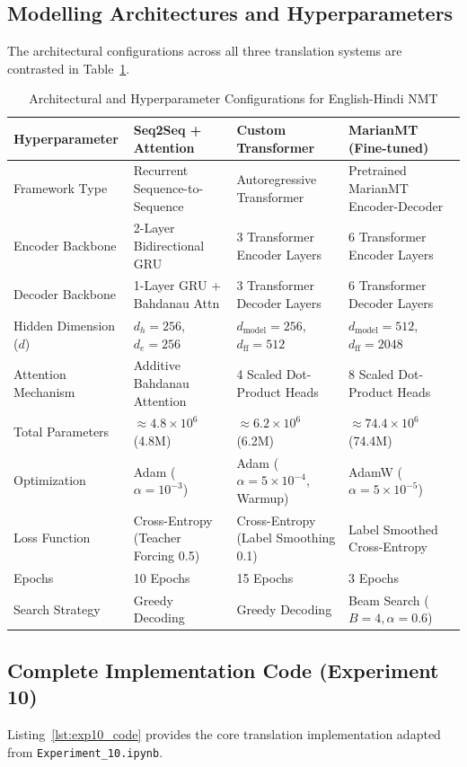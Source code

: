 \documentclass[12pt,a4paper]{report}
\begin{document}
\subsection{Modelling Architectures and Hyperparameters}
The architectural configurations across all three translation systems are contrasted in Table~\ref{tab:exp10_architectures}.

\begin{table}[H]
\centering
\caption{Architectural and Hyperparameter Configurations for English-Hindi NMT}
\label{tab:exp10_architectures}
\begin{tabularx}{\textwidth}{lXXX}
\toprule
\textbf{Hyperparameter} & \textbf{Seq2Seq + Attention} & \textbf{Custom Transformer} & \textbf{MarianMT (Fine-tuned)} \\
\midrule
Framework Type & Recurrent Sequence-to-Sequence & Autoregressive Transformer & Pretrained MarianMT Encoder-Decoder \\
Encoder Backbone & 2-Layer Bidirectional GRU & 3 Transformer Encoder Layers & 6 Transformer Encoder Layers \\
Decoder Backbone & 1-Layer GRU + Bahdanau Attn & 3 Transformer Decoder Layers & 6 Transformer Decoder Layers \\
Hidden Dimension ($d$) & $d_h = 256$, $d_e = 256$ & $d_{\text{model}} = 256$, $d_{\text{ff}} = 512$ & $d_{\text{model}} = 512$, $d_{\text{ff}} = 2048$ \\
Attention Mechanism & Additive Bahdanau Attention & 4 Scaled Dot-Product Heads & 8 Scaled Dot-Product Heads \\
Total Parameters & $\approx 4.8 \times 10^6$ (4.8M) & $\approx 6.2 \times 10^6$ (6.2M) & $\approx 74.4 \times 10^6$ (74.4M) \\
Optimization & Adam ($\alpha = 10^{-3}$) & Adam ($\alpha = 5\times 10^{-4}$, Warmup) & AdamW ($\alpha = 5\times 10^{-5}$) \\
Loss Function & Cross-Entropy (Teacher Forcing 0.5) & Cross-Entropy (Label Smoothing 0.1) & Label Smoothed Cross-Entropy \\
Epochs & 10 Epochs & 15 Epochs & 3 Epochs \\
Search Strategy & Greedy Decoding & Greedy Decoding & Beam Search ($B=4, \alpha=0.6$) \\
\bottomrule
\end{tabularx}
\end{table}

\subsection{Complete Implementation Code (Experiment 10)}
Listing~\ref{lst:exp10_code} provides the core translation implementation adapted from \texttt{Experiment\_10.ipynb}.
\end{document}
